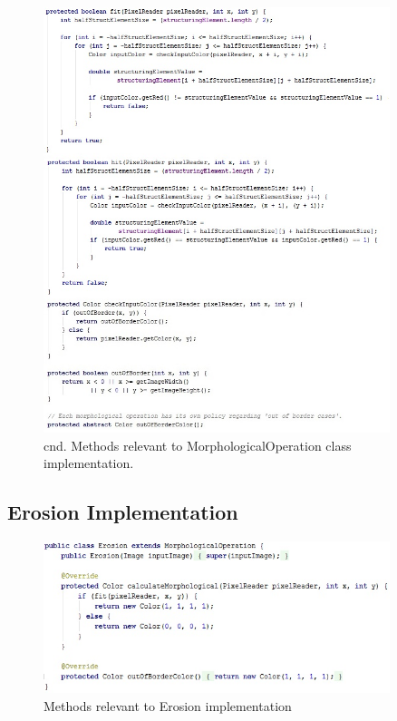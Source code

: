 \documentclass{article}
\begin{document}
\newpage


\begin{figure}[H]
	\centering
	\includegraphics[width=0.9\textwidth]{_Figures/code/morph_2.jpg}
    \caption{cnd. Methods relevant to MorphologicalOperation class implementation.}
    \label{fig:code:blur}
\end{figure}


\newpage
%
%
\subsection{Erosion Implementation} \label{erosion_impl}
\begin{figure}[H]
	\centering
	\includegraphics[width=0.9\textwidth]{_Figures/code/erosion.jpg}
    \caption{Methods relevant to Erosion implementation}
    \label{fig:code:erosion}
\end{figure}
\end{document}
